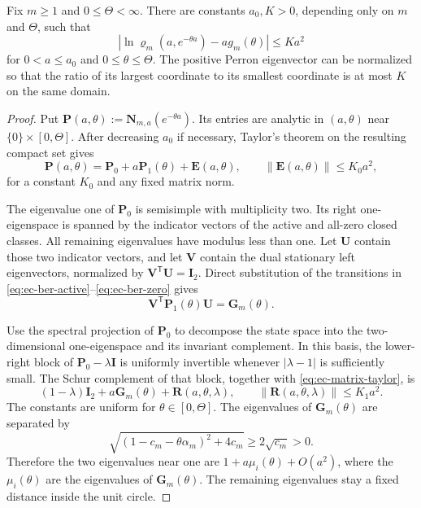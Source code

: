 \begin{lemma}
\label{lem:ec-two-class-perturbation}
Fix $m\geq1$ and $0\leq\Theta<\infty$.  There are constants
$a_0,K>0$, depending only on $m$ and $\Theta$, such that
\begin{equation}
 \left|
 \ln\varrho_m(a,e^{-\theta a})-a g_m(\theta)
 \right|\leq Ka^2
 \label{eq:ec-uniform-perturbation}
\end{equation}
for $0<a\leq a_0$ and $0\leq\theta\leq\Theta$.
The positive Perron eigenvector can be normalized so that the ratio of its
largest coordinate to its smallest coordinate is at most $K$ on the same
domain.
\end{lemma}

\begin{proof}
Put $\mathbf P(a,\theta):=\mathbf N_{m,a}(e^{-\theta a})$.
Its entries are analytic in $(a,\theta)$ near
$\{0\}\times[0,\Theta]$.  After decreasing $a_0$ if necessary, Taylor's
theorem on the resulting compact set gives
\begin{equation}
 \mathbf P(a,\theta)=\mathbf P_0+a\mathbf P_1(\theta)
 +\mathbf E(a,\theta),
 \qquad \|\mathbf E(a,\theta)\|\leq K_0a^2,
 \label{eq:ec-matrix-taylor}
\end{equation}
for a constant $K_0$ and any fixed matrix norm.

The eigenvalue one of $\mathbf P_0$ is semisimple with multiplicity two.
Its right one-eigenspace is spanned by the indicator vectors of the active
and all-zero closed classes.  All remaining eigenvalues have modulus less
than one.  Let $\mathbf U$ contain those two indicator vectors, and let $\mathbf V$
contain the dual stationary left eigenvectors, normalized by
$\mathbf V^{\mathsf T}\mathbf U=\mathbf I_2$.  Direct substitution of the
transitions in \eqref{eq:ec-ber-active}--\eqref{eq:ec-ber-zero} gives
\begin{equation}
 \mathbf V^{\mathsf T}\mathbf P_1(\theta)\mathbf U
 =\mathbf G_m(\theta).
 \label{eq:ec-compressed-derivative}
\end{equation}

Use the spectral projection of $\mathbf P_0$ to decompose the state space
into the two-dimensional one-eigenspace and its invariant complement.  In
this basis, the lower-right block of
$\mathbf P_0-\lambda\mathbf I$ is uniformly invertible whenever
$|\lambda-1|$ is sufficiently small.  The Schur complement of that block,
together with \eqref{eq:ec-matrix-taylor}, is
\begin{equation}
 (1-\lambda)\mathbf I_2
 +a\mathbf G_m(\theta)+\mathbf R(a,\theta,\lambda),
 \qquad \|\mathbf R(a,\theta,\lambda)\|\leq K_1a^2.
 \label{eq:ec-schur-complement}
\end{equation}
The constants are uniform for $\theta\in[0,\Theta]$.
The eigenvalues of $\mathbf G_m(\theta)$ are separated by
\[
 \sqrt{(1-c_m-\theta\alpha_m)^2+4c_m}\geq2\sqrt{c_m}>0.
\]
Therefore the two
eigenvalues near one are
$1+a\mu_i(\theta)+O(a^2)$, where the $\mu_i(\theta)$ are the eigenvalues of
$\mathbf G_m(\theta)$.  The remaining eigenvalues stay a fixed distance
inside the unit circle.


\end{proof}

